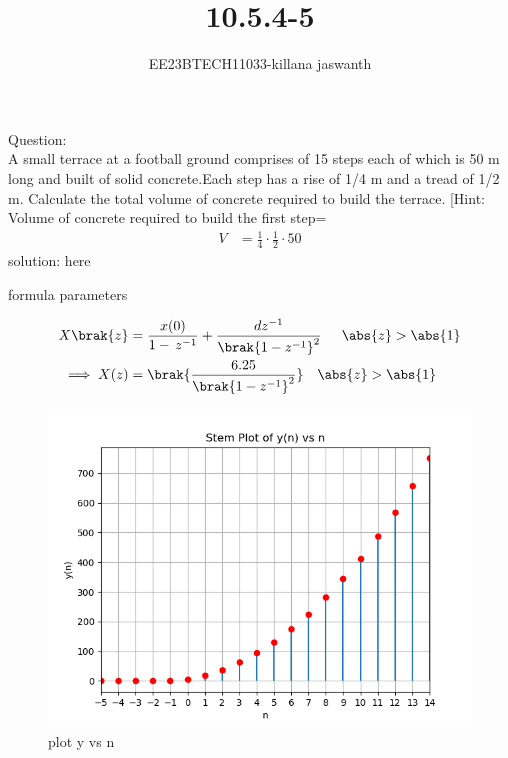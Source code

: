 \documentclass[journal,12pt,twocolumn]{IEEEtran}
\theoremstyle{remark}
\begin{document}

\vspace{3cm}

\title{10.5.4-5}
\author{EE23BTECH11033-killana jaswanth}
\maketitle
\newpage

\bigskip

\renewcommand{\thefigure}{\theenumi}
\renewcommand{\thetable}{\theenumi}
Question:\\
A small terrace at a football ground comprises of 15 steps each of which is 50
m long and built of solid concrete.Each step has a rise of 1/4 m and a tread of
1/2 m. Calculate the total volume of concrete required to build the terrace.
[Hint: Volume of concrete required to build the first step=\begin{align}
    V&=\frac{1}{4} \cdot \frac{1}{2} \cdot 50 
\end{align}
solution:
\fi
here\begin{table}[!ht]
 \centering
  
   \caption{formula parameters}
   \label{tab:10.5.4.5}
   \end{table}
\begin{align}
 X\brak{z}&=\frac{x(0)}{1-\,z^{-1}}+\frac{dz^{-1}}{\brak{1-{z^{-1}}}^2}\:\:
\quad\abs{z}>\abs{1}\\
\implies X(z)&=\brak{\frac{6.25}{\brak{1-z^{-1}}^2}} \quad\abs{z}>\abs{1}
\end{align}
\begin{figure}[!ht]
    \centering
    \includegraphics[width=1\linewidth]{ncert-maths/10/5/4/5/figs/fig.png}
    \caption{plot y vs n}
\end{figure}
\end{document}
